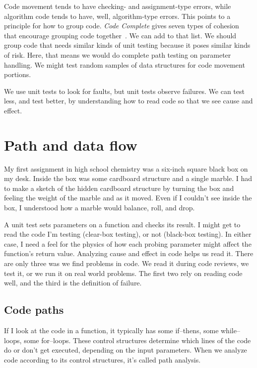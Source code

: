 \documentclass[fleqn,10pt]{olplainarticle}
\begin{document}
Code movement tends to have checking- and assignment-type errors,
while algorithm code tends to have, well, algorithm-type errors.
This points to a principle for how to group code.
\emph{Code Complete} gives seven types of cohesion that encourage
grouping code together~\citep{mcconnell2004code}. We can add to that list. We should group
code that needs similar kinds of unit testing because it poses
similar kinds of risk. Here, that means we would do complete
path testing on parameter handling. We might test random samples
of data structures for code movement portions.

We use unit tests to look for faults, but unit tests observe
failures. We can test less, and test better, by understanding
how to read code so that we see cause and effect.


\section{Path and data flow}

My first assignment in high school chemistry was a six-inch square
black box on my desk. Inside the box was some cardboard structure
and a single marble. I had to make a sketch of the hidden cardboard
structure by turning the box and feeling the weight of the marble
and as it moved. Even if I couldn't see inside the box, I
understood how a marble would balance, roll, and drop.

A unit test sets parameters on a function and checks its result.
I might get to read the code I'm testing (clear-box testing),
or not (black-box testing). In either case, I need a feel for
the physics of how each probing parameter might affect the
function's return value. Analyzing cause and effect in code
helps us read it. There are only three was we find problems
in code. We read it during code reviews, we test it, or we run it on
real world problems. The first two rely on reading code well,
and the third is the definition of failure.

\subsection{Code paths}\label{sec:code-paths}

If I look at the code in a function, it typically has
some if--thens, some while--loops, some for--loops. These
control structures determine which lines of the code do
or don't get executed, depending on the input parameters.
When we analyze code according to its control structures,
it's called path analysis.
\end{document}
